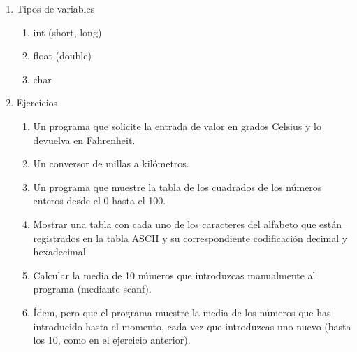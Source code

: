 \documentclass[a4paper,oneside]{article}
\begin{document}
\begin{enumerate}
\begin{verbatim}
  fahr = lower;
  while( fahr <= upper )
  {
    celsius = 5 * (fahr - 32) / 9;
    printf( "%d\t%d\n", fahr, celsius );
    fahr = fahr + step;
  }
}
    \end{verbatim}
  \item Tipos de variables
    \begin{enumerate}
      \item int (short, long)
      \item float (double)
      \item char
    \end{enumerate}
  \item Ejercicios
    \begin{enumerate}
    \item Un programa que solicite la entrada de valor en grados Celsius y lo devuelva en Fahrenheit.
    \item Un conversor de millas a kilómetros.
    \item Un programa que muestre la tabla de los cuadrados de los números enteros desde el 0 hasta el 100.
    \item Mostrar una tabla con cada uno de los caracteres del alfabeto que están registrados en la tabla ASCII y su correspondiente codificación decimal y hexadecimal.
    \item Calcular la media de 10 números que introduzcas manualmente al programa (mediante scanf).
    \item Ídem, pero que el programa muestre la media de los números que has introducido hasta el momento, cada vez que introduzcas uno nuevo (hasta los 10, como en el ejercicio anterior).
    \end{enumerate}
  \end{enumerate}
\end{document}
